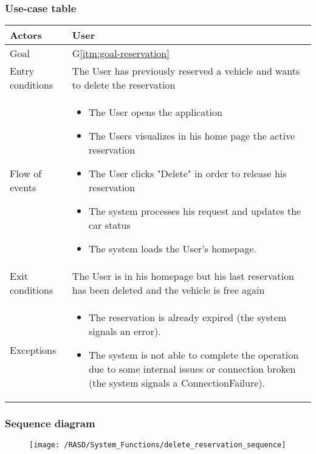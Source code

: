 \subsubsection{Use-case table}
\begin{center}
  \begin{tabular}{ l | p{10cm} }
    \hline
    Actors & User\\ \hline
    Goal & G\ref{itm:goal-reservation}\\ \hline
    Entry conditions & The User has previously reserved a vehicle and wants to delete the reservation
     \\ \hline
    Flow of events &
    \begin{itemize} 
      \item The User opens the application 
      \item The Users visualizes in his home page the active reservation
      \item The User clicks "Delete" in order to release his reservation
      \item The system processes his request and updates the car status
      \item The system loads the User's homepage.
    \end{itemize} \\ \hline
    Exit conditions & The User is in his homepage but his last reservation has been deleted and the vehicle is free again \\ \hline
  	Exceptions & 
    \begin{itemize}
      \item The reservation is already expired (the system signals an error).
      \item The system is not able to complete the operation due to some internal issues or connection broken (the system signals a ConnectionFailure).
    \end{itemize} \\ \hline
  \end{tabular}
\end{center}


\subsubsection{Sequence diagram}
\begin{figure}[!ht]
  \centering
  \vspace{0.2cm}
  \texttt{[image: /RASD/System\_Functions/delete\_reservation\_sequence]}\\
  \vspace{0.4cm}
  \label{fig:delete_reservation_sequence} 
\end{figure}

